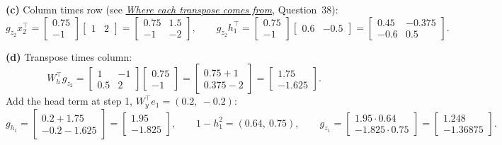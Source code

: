 \documentclass[12pt,a4paper]{article}
\newcommand{\seeconcept}[3]{(see \hyperref[#1]{\textit{#2}}, Question~#3)}
\begin{document}
\textbf{(c)} Column times row \seeconcept{c:transposes}{Where each transpose comes from}{38}:
\[
g_{z_2}x_2^\top=\begin{bmatrix}0.75\\-1\end{bmatrix}\begin{bmatrix}1&2\end{bmatrix}=\begin{bmatrix}0.75&1.5\\-1&-2\end{bmatrix},\qquad
g_{z_2}h_1^\top=\begin{bmatrix}0.75\\-1\end{bmatrix}\begin{bmatrix}0.6&-0.5\end{bmatrix}=\begin{bmatrix}0.45&-0.375\\-0.6&0.5\end{bmatrix}.
\]

\textbf{(d)} Transpose times column:
\[
W_h^\top g_{z_2}=\begin{bmatrix}1&-1\\0.5&2\end{bmatrix}\begin{bmatrix}0.75\\-1\end{bmatrix}=\begin{bmatrix}0.75+1\\0.375-2\end{bmatrix}=\begin{bmatrix}1.75\\-1.625\end{bmatrix}.
\]
Add the head term at step 1, $W_y^\top e_1=(0.2,\ -0.2)$:
\[
g_{h_1}=\begin{bmatrix}0.2+1.75\\-0.2-1.625\end{bmatrix}=\begin{bmatrix}1.95\\-1.825\end{bmatrix},\qquad
1-h_1^2=(0.64,\ 0.75),\qquad g_{z_1}=\begin{bmatrix}1.95\cdot0.64\\-1.825\cdot0.75\end{bmatrix}=\begin{bmatrix}1.248\\-1.36875\end{bmatrix}.
\]
\end{document}
